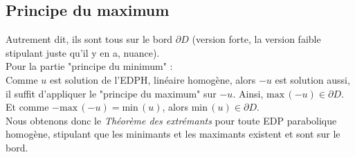 \documentclass[11pt, a4paper, openany]{book}
\begin{document}
			\subsection{Principe du maximum}
			Autrement dit, ils sont tous sur le bord $\partial D$ (version forte, la version faible stipulant juste qu'il y en a, nuance).\\
			Pour la partie "principe du minimum" :\\
																	
			Comme $u$ est solution de l'EDPH, linéaire homogène, alors $-u$ est solution aussi, il suffit d'appliquer le "principe du maximum" sur $-u$. Ainsi, $\text{max}\,(-u)\in\partial D$. Et comme $-\text{max}\,(-u)=\text{min}\,(u)$, alors $\text{min}\,(u)\in\partial D$.\\
																	
			Nous obtenons donc le \textit{Théorème des extrémants} pour toute EDP parabolique homogène, stipulant que les minimants et les maximants existent et sont sur le bord.
																	
			\setcounter{subsection}{2}
\end{document}
